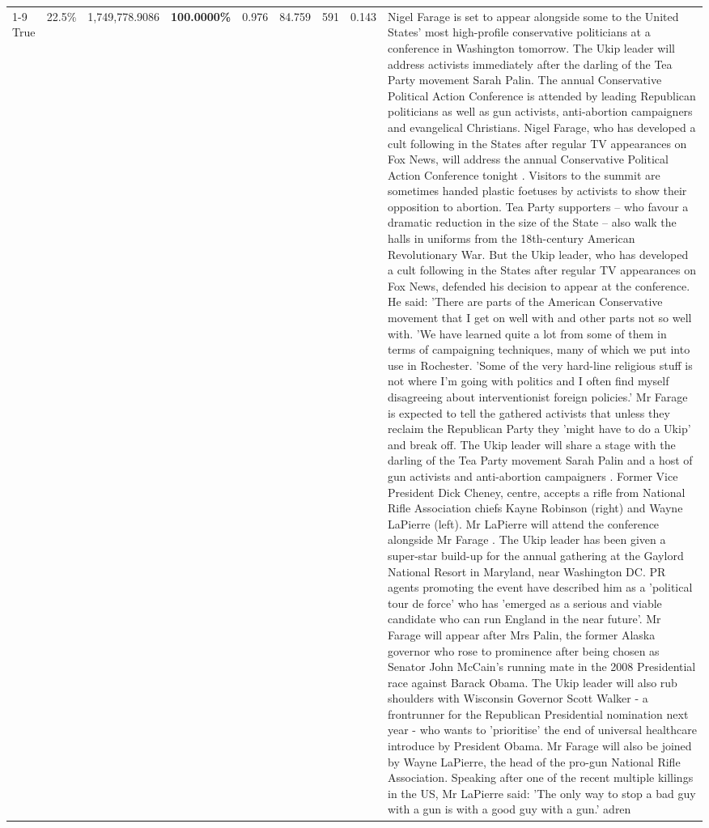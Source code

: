 \begin{table}[H]
\begin{tabular}{lllrlllll}
\cline{1-9} \cline{2-9}
True & 22.5\% & 1,749,778.9086 & \bfseries \color{red} 100.0000\% & 0.976 & 84.759 & 591 & 0.143 & Nigel Farage is set to appear alongside some to the United States' most high-profile conservative politicians at a conference in Washington tomorrow. The Ukip leader will address activists immediately after the darling of the Tea Party movement Sarah Palin. The annual Conservative Political Action Conference is attended by leading Republican politicians as well as gun activists, anti-abortion campaigners and evangelical Christians. Nigel Farage, who has developed a cult following in the States after regular TV appearances on Fox News, will address the annual Conservative Political Action Conference tonight . Visitors to the summit are sometimes handed plastic foetuses by activists to show their opposition to abortion. Tea Party supporters – who favour a dramatic reduction in the size of the State – also walk the halls in uniforms from the 18th-century American Revolutionary War. But the Ukip leader, who has developed a cult following in the States after regular TV appearances on Fox News, defended his decision to appear at the conference. He said: 'There are parts of the American Conservative movement that I get on well with and other parts not so well with. 'We have learned quite a lot from some of them in terms of campaigning techniques, many of which we put into use in Rochester. 'Some of the very hard-line religious stuff is not where I'm going with politics and I often find myself disagreeing about interventionist foreign policies.' Mr Farage is expected to tell the gathered activists that unless they reclaim the Republican Party they 'might have to do a Ukip' and break off. The Ukip leader will share a stage with the darling of the Tea Party movement Sarah Palin and a host of gun activists and anti-abortion campaigners . Former Vice President Dick Cheney, centre, accepts a rifle from National Rifle Association chiefs Kayne Robinson (right) and Wayne LaPierre (left). Mr LaPierre will attend the conference alongside Mr Farage . The Ukip leader has been given a super-star build-up for the annual gathering at the Gaylord National Resort in Maryland, near Washington DC. PR agents promoting the event have described him as a 'political tour de force' who has 'emerged as a serious and viable candidate who can run England in the near future'. Mr Farage will appear after Mrs Palin, the former Alaska governor who rose to prominence after being chosen as Senator John McCain's running mate in the 2008 Presidential race against Barack Obama. The Ukip leader will also rub shoulders with Wisconsin Governor Scott Walker - a frontrunner for the Republican Presidential nomination next year - who wants to 'prioritise' the end of universal healthcare introduce by President Obama. Mr Farage will also be joined by Wayne LaPierre, the head of the pro-gun National Rifle Association. Speaking after one of the recent multiple killings in the US, Mr LaPierre said: 'The only way to stop a bad guy with a gun is with a good guy with a gun.' adren \\

\end{tabular}
\end{table}
